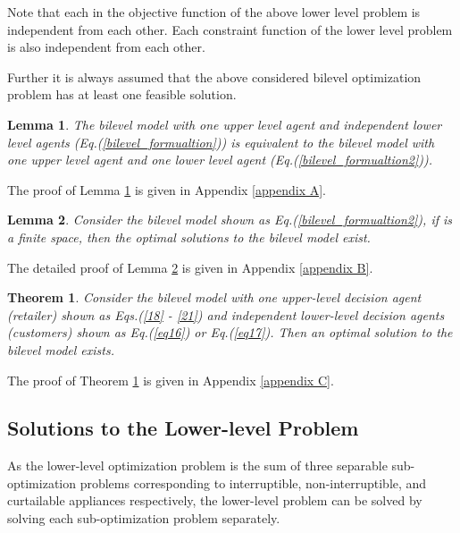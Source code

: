 \documentclass[10pt,journal]{IEEEtran}
\theoremstyle{definition}
\theoremstyle{plain} \newtheorem{theo}{Theorem} \newtheorem{prop}{Proposition}  \newtheorem{lemm}{Lemma}
\begin{document}
\vspace{-1cm}


Note that each  in the objective function of the above lower level problem is independent from each other. Each constraint function  of the lower level problem is also independent from each other.

Further it is always assumed that the above considered bilevel optimization problem has at least one feasible solution. 







\begin{lemm} \label{lemma} 
The bilevel model with one upper level agent and  independent lower level agents (Eq.(\ref{bilevel_formualtion})) is equivalent to the bilevel model with one upper level agent and one lower level agent (Eq.(\ref{bilevel_formualtion2})).
\end{lemm}

The proof of Lemma \ref{lemma} is given in Appendix \ref{appendix A}. 



\begin{lemm} \label{lemma1}
Consider the bilevel model shown as Eq.(\ref{bilevel_formualtion2}), if  is a finite space, then the optimal solutions to the bilevel model exist. 
\end{lemm}

The detailed proof of Lemma \ref{lemma1} is given in Appendix \ref{appendix B}. 

\begin{theo} \label{theoB1}
Consider the bilevel model with one upper-level decision agent (retailer) shown as  Eqs.(\ref{18} - \ref{21}) and  independent lower-level decision agents (customers) shown as  Eq.(\ref{eq16}) or Eq.(\ref{eq17}). Then an optimal solution to the bilevel model exists. 
\end{theo}

The proof of Theorem \ref{theoB1} is given in Appendix \ref{appendix C}.

\subsection{Solutions to the Lower-level Problem} \label{4-a}

As the lower-level optimization problem is the sum of three separable sub-optimization problems corresponding to interruptible, non-interruptible, and curtailable appliances respectively, the lower-level problem can be solved by solving each sub-optimization problem separately.  
\end{document}
